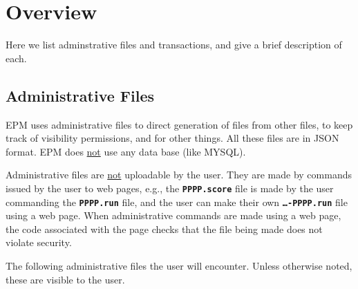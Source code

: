 \documentclass[12pt]{article}
\newcommand{\TT}[1]{{\tt \bfseries #1}}
\begin{document}
\section{Overview}

Here we list adminstrative files and transactions, and give a
brief description of each.

\subsection{Administrative Files}

EPM uses administrative files to direct generation of files from
other files, to keep track of visibility
permissions, and for other things.  All these files are in JSON
format.  EPM does \underline{not} use any data base (like MYSQL).

Administrative files are \underline{not} uploadable by the user.
They are made by commands issued by the user to web pages, e.g.,
the \TT{PPPP.score} file is made by the user commanding
the \TT{PPPP.run} file, and the user can make their own
\TT{\ldots-PPPP.run} file using a web page.  When administrative
commands are made using a web page, the code associated with the
page checks that the file being made does not violate security.

The following administrative files the user will encounter.
Unless otherwise noted, these are visible to the user.
\end{document}
